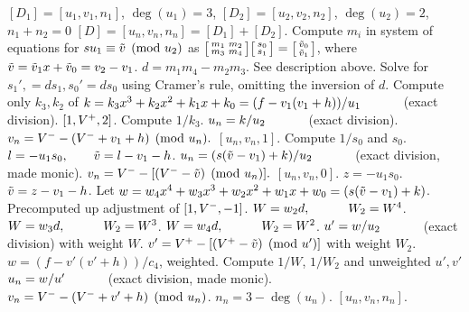 \begin{algorithm}[htbp]
\caption{Genus 3 Split Model Degree 2 and 3 Addition with Up Adjust\label{alg:g3explSPLIT23ADDUP}}
\begin{algorithmic} [1]
\Require $[D_1] = [u_1,v_1,n_1]$, $\deg(u_1) = 3$, $[D_2] = [u_2,v_2,n_2]$, $\deg(u_2) = 2$, $n_1 + n_2 = 0$
\Ensure $[D] = [u_n,v_n,n_n] = [D_1] + [D_2] $.
\algrule
\vspace{-2pt}
\State Compute $m_i$ in system of equations for $su_1\equiv \tilde{v} \pmod{u_2}$ as $ \bigl[ \begin{smallmatrix} m_1 & m_2\\ m_3 & m_4\end{smallmatrix}\bigr] \bigl[ \begin{smallmatrix} s_0\\ s_1 \end{smallmatrix} \bigr ] = \bigl[ \begin{smallmatrix}\tilde{v}_0 \\  \tilde{v}_1\end{smallmatrix} \bigr ]$, where $\tilde{v} = \tilde{v}_1x + \tilde{v}_0 = v_2 - v_1$.
\State $d = m_1m_4 - m_2m_3$.
    \State See description above.
\EndIf
\State Solve for $s_1', = ds_1, s_0' = ds_0$ using Cramer's rule, omitting the inversion of $d$.
\State Compute only $k_3, k_2$ of $k = k_3x^3 + k_2x^2 + k_1x + k_0 = (f - v_1(v_1 + h))/u_1 \quad\quad\quad$ (exact division).  
         \Return $[1,V^{+},2]$.
        \Else \hspace{3pt} Compute $1/k_3$.
            \State $u_n = k/u_2 \quad\quad\quad$ (exact division).
            \State $v_n = V^{-} - (V^{-} + v_1 + h) \pmod{u_n}.$
            \State \Return $[u_n,v_n,1]$.
        \EndIf
    \Else \hspace{3pt} Compute $1/s_0$ and $s_0$.
        \State $l = -u_1s_0, \quad\quad \tilde{v} = l - v_1 - h$.
        \State $u_n = (s(\tilde{v} - v_1) + k)/u_2 \quad\quad\quad$ (exact division, made monic).
        \State $v_n = V^{-} - [(V^{-} - \tilde{v}) \pmod{u_n}].$
        \State \Return $[u_n,v_n,0]$.
    \EndIf
\EndIf
\State $z = -u_1s_0$.
\State $\tilde{v} = z - v_1 - h$.
\State Let $w = w_4x^4 + w_3x^3 + w_2x^2 + w_1x + w_0 = (s(\tilde{v} - v_1) + k)$.
         \Return Precomputed up adjustment of $[1,V^{-},-1]$.
        \Else \hspace{3pt} $W = w_2d, \quad\quad\quad W_2 = W^4$.
        \EndIf
    \Else \hspace{3pt} $W = w_3d, \quad\quad\quad W_2 = W^3$.
    \EndIf
\Else \hspace{3pt} $W = w_4d, \quad\quad\quad W_2 = W^2$.
\EndIf
\State $u' = w/u_2 \quad\quad\quad$ (exact division) with weight $W$.
\State $v' = V^{+} - [(V^{+} - \tilde{v}) \pmod{u'}]$  with weight $W_2$.
\State $w = (f - v'(v' + h))/c_4$, weighted.
\State Compute $1/W$, $1/W_2$ and unweighted $u',v'$
\State $u_n = w/u' \quad\quad\quad$ (exact division, made monic).
\State $v_n = V^{-} - (V^{-} + v' + h) \pmod{u_n}$.
\State $n_n = 3 - \deg(u_n)$.
\State \Return $[u_n, v_n,n_n]$.
\vspace{-2pt}
\end{algorithmic}
\end{algorithm}

